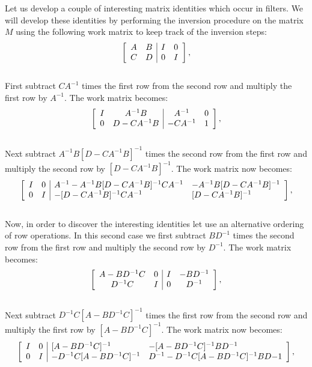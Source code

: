 Let us develop a couple of interesting matrix identities which occur in filters. We will develop these identities by performing the inversion procedure on the matrix $M$ using the following work matrix to keep track of the inversion steps:
$$\left[
\begin{array}{c c | cc}
 A & B & I  & 0 \\
C & D & 0  & I \\
\end{array}\right],$$\\

First subtract $CA^{-1}$ times the first row from the second row and multiply the first row by $A^{-1}$. The work matrix becomes:
$$\left[
\begin{array}{c c | cc}
 I & A^{-1} B & A^{-1}  & 0 \\
0 & D - CA^{-1}B  & -CA^{-1}  & 1 \\
\end{array}\right],$$\\

Next subtract $A^{-1}B[D-CA^{-1}B]^{-1}$ times the second row from the first row and multiply the second row by $[D-CA^{-1}B]^{-1}$. The work matrix now becomes:
$$\left[
\begin{array}{c c | ll}
 I & 0 & A^{-1} - A^{-1}B[D-CA^{-1}B]^{-1}CA^{-1}  & -A^{-1}B[D-CA^{-1}B]^{-1} \\
0 & I   & -[D-CA^{-1}B]^{-1}CA^{-1}  & [D-CA^{-1}B]^{-1} \\
\end{array}\right],$$\\

Now, in order to discover the interesting identities let use an alternative ordering of row operations. In this second case we 
first subtract $BD^{-1}$ times the second row from the first row and multiply the second row by $D^{-1}$. The work matrix becomes:
$$\left[
\begin{array}{c c | cc}
 A - BD^{-1}C  & 0  & I  & -BD^{-1} \\
D^{-1}C & I  &  0  & D^{-1} \\
\end{array}\right],$$\\

Next subtract $D^{-1}C[A-BD^{-1}C]^{-1}$ times the first row from the second row and multiply the first row by $[A-BD^{-1}C]^{-1}$. The work matrix now becomes:
$$\left[
\begin{array}{c c | ll}
 I & 0 & [A-BD^{-1}C]^{-1}  & -[A-BD^{-1}C]^{-1}BD^{-1} \\
0 & I   & -D^{-1}C[A-BD^{-1}C]^{-1}  & D^{-1}  -D^{-1}C[A-BD^{-1}C]^{-1}BD{-1}  \\
\end{array}\right],$$

